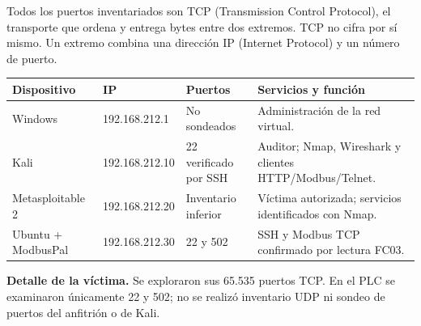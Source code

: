 \documentclass[11pt,a4paper]{article}
\begin{document}
Todos los puertos inventariados son TCP (Transmission Control Protocol), el transporte que ordena y entrega bytes entre dos extremos. TCP no cifra por sí mismo. Un extremo combina una dirección IP (Internet Protocol) y un número de puerto.
{\small\renewcommand{\arraystretch}{1.15}
\par\begin{tabularx}{\linewidth}{@{}P{2.8cm}P{2.8cm}P{2.5cm}Y@{}}\toprule
Dispositivo & IP & Puertos & Servicios y función\\\midrule
Windows & 192.168.212.1 & No sondeados & Administración de la red virtual.\\
Kali & 192.168.212.10 & 22 verificado por SSH & Auditor; Nmap, Wireshark y clientes HTTP/Modbus/Telnet.\\
Metasploitable 2 & 192.168.212.20 & Inventario inferior & Víctima autorizada; servicios identificados con Nmap.\\
Ubuntu + ModbusPal & 192.168.212.30 & 22 y 502 & SSH y Modbus TCP confirmado por lectura FC03.\\\bottomrule
\end{tabularx}}
\textbf{Detalle de la víctima.} Se exploraron sus 65.535 puertos TCP. En el PLC se examinaron únicamente 22 y 502; no se realizó inventario UDP ni sondeo de puertos del anfitrión o de Kali.
\end{document}
